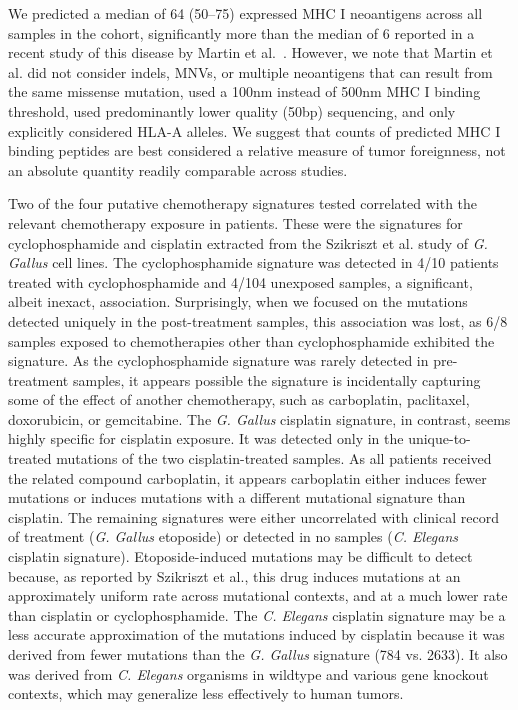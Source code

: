 We predicted a median of 64 (50--75) expressed MHC I neoantigens across all samples in the cohort, significantly more than the median of 6 reported in a recent study of this disease by Martin et al.~\cite{Martin_2016}. However, we note that Martin et al. did not consider indels, MNVs, or multiple neoantigens that can result from the same missense mutation, used a 100nm instead of 500nm MHC I binding threshold, used predominantly lower quality (50bp) sequencing, and only explicitly considered HLA-A alleles. We suggest that counts of predicted MHC I binding peptides are best considered a relative measure of tumor foreignness, not an absolute quantity readily comparable across studies.

Two of the four putative chemotherapy signatures tested correlated with the relevant chemotherapy exposure in patients. These were the signatures for cyclophosphamide and cisplatin extracted from the Szikriszt et al. study of \textit{G. Gallus} cell lines. The cyclophosphamide signature was detected in 4/10 patients treated with cyclophosphamide and 4/104 unexposed samples, a significant, albeit inexact, association. Surprisingly, when we focused on the mutations detected uniquely in the post-treatment samples, this association was lost, as 6/8 samples exposed to chemotherapies other than cyclophosphamide exhibited the signature. As the cyclophosphamide signature was rarely detected in pre-treatment samples, it appears possible the signature is incidentally capturing some of the effect of another chemotherapy, such as carboplatin, paclitaxel, doxorubicin, or gemcitabine. The \textit{G. Gallus} cisplatin signature, in contrast, seems highly specific for cisplatin exposure. It was detected only in the unique-to-treated mutations of the two cisplatin-treated samples. As all patients received the related compound carboplatin, it appears carboplatin either induces fewer mutations or induces mutations with a different mutational signature than cisplatin. The remaining signatures were either uncorrelated with clinical record of treatment (\textit{G. Gallus} etoposide) or detected in no samples (\textit{C. Elegans} cisplatin signature). Etoposide-induced mutations may be difficult to detect because, as reported by Szikriszt et al., this drug induces mutations at an approximately uniform rate across mutational contexts, and at a much lower rate than cisplatin or cyclophosphamide. The \textit{C. Elegans} cisplatin signature may be a less accurate approximation of the mutations induced by cisplatin because it was derived from fewer mutations than the \textit{G. Gallus} signature (784 vs. 2633). It also was derived from \textit{C. Elegans} organisms in wildtype and various gene knockout contexts, which may generalize less effectively to human tumors.

